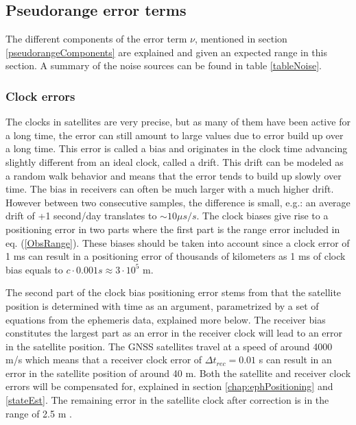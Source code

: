 \subsection{Pseudorange error terms}
The different components of the error term $\nu$, mentioned in section \ref{pseudorangeComponents} are explained and given an expected range in this section. A summary of the noise sources can be found in table \ref{tableNoise}.
\subsubsection{Clock errors}\label{clockErrors}
The clocks in satellites are very precise, but as many of them have been active for a long time, the error can still amount to large values due to error build up over a long time. This error is called a bias and originates in the clock time advancing slightly different from an ideal clock, called a drift. This drift can be modeled as a random walk behavior and means that the error tends to build up slowly over time. The bias in receivers can often be much larger with a much higher drift. However between two consecutive samples, the difference is small, e.g.: an average drift of +1 second/day translates to $\sim10\mu s/s$. The clock biases give rise to a positioning error in two parts where the first part is the range error included in eq. (\ref{ObsRange}). These biases should be taken into account since a clock error of 1 ms can result in a positioning error of thousands of kilometers as 1 ms of clock bias equals to $c\cdot 0.001s\approx3\cdot 10^5$ m. 
\par
The second part of the clock bias positioning error stems from that the satellite position is determined with time as an argument, parametrized by a set of equations from the ephemeris data, explained more below. The receiver bias constitutes the largest part as an error in the receiver clock will lead to an error in the satellite position. The GNSS satellites travel at a speed of around 4000 m/s which means that a receiver clock error of $\Delta t_{rec}=0.01$ s can result in an error in the satellite position of around 40 m. Both the satellite and receiver clock errors will be compensated for, explained in section \ref{chap:ephPositioning} and \ref{stateEst}. The remaining error in the satellite clock after correction is in the range of 2.5 m \cite{Jeffrey}.

